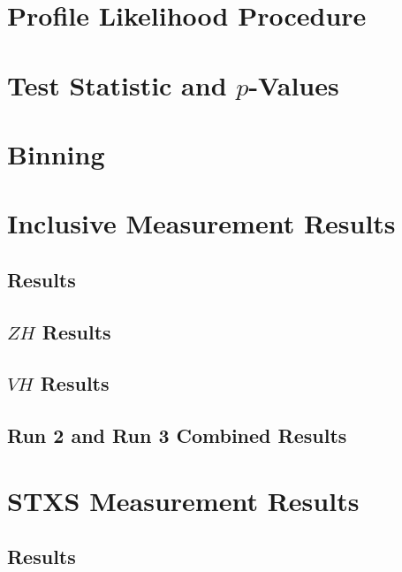 \documentclass{umassthesis}          %
\begin{document}
\section{Profile Likelihood Procedure}\label{sec:statistical_analysis_pl}

\section{Test Statistic and $p$-Values}\label{sec:statistical_analysis_test_statistic}

\section{Binning}\label{sec:statistical_analysis_binning}

\section{Inclusive Measurement Results}\label{sec:statistical_analysis_results}

\subsection{\wh{} Results}\label{sec:statistical_analysis_wh_results}

\subsection{$ZH$ Results}\label{sec:statistical_analysis_zh_results}

\subsection{$VH$ Results}\label{sec:statistical_analysis_vh_results}

\subsection{Run 2 and Run 3 Combined  Results}\label{sec:statistical_analysis_combined_expected_results}

\section{STXS Measurement Results}\label{sec:statistical_analysis_stxs_expected_results}

\subsection{\wh{} Results}\label{sec:statistical_analysis_stxs_wh_results}

\end{document}
